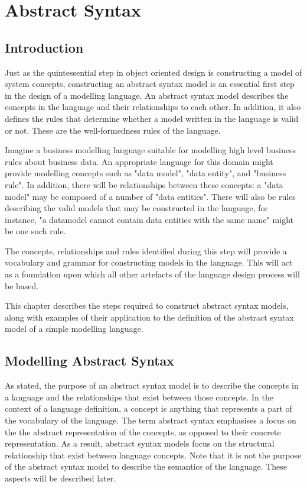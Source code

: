 \chapter{Abstract Syntax}
\label{abschapter}

\section{Introduction}

Just as the quintessential step in object oriented design is
constructing a model of system concepts, constructing an abstract
syntax model is an essential first step in the design of a
modelling language. An abstract syntax model describes the
concepts in the language and their relationships to each other. In
addition, it also defines the rules that determine whether a model
written in the language is valid or not. These are the
well-formedness rules of the language.

Imagine a business modelling language suitable for modelling high
level business rules about business data. An appropriate language
for this domain might provide modelling concepts such as "data
model", "data entity", and "business rule". In addition, there
will be relationships between these concepts: a "data model" may
be composed of a number of "data entities". There will also be
rules describing the valid models that may be constructed in the
language, for instance, "a datamodel cannot contain data entities
with the same name" might be one such rule.

The concepts, relationships and rules identified during this step
will  provide a vocabulary and grammar for constructing models in
the language. This will act as a foundation upon which all other
artefacts of the language design process will be based.

This chapter describes the steps required to construct abstract
syntax models, along with examples of their application to the
definition of the abstract syntax model of a simple modelling
language.

\section{Modelling Abstract Syntax}

As stated, the purpose of an abstract syntax model is to describe
the concepts in a language and the relationships that exist
between those concepts. In the context of a language definition, a
concept is anything that represents a part of the vocabulary of
the language. The term abstract syntax emphasises a focus on the
the abstract representation of the concepts, as opposed to their
concrete representation. As a result, abstract syntax models focus
on the structural relationship that exist between language
concepts. Note that it is not the purpose of the abstract syntax
model to describe the semantics of the language. These aspects
will be described later.

